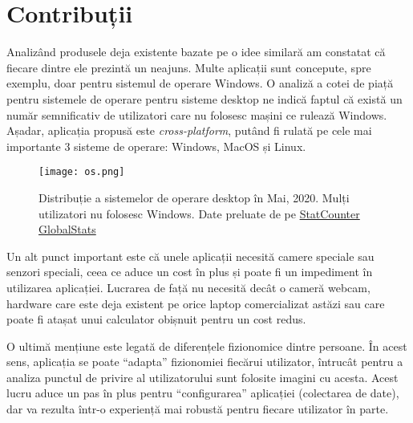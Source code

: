 \chapter*{Contribuții} 

Analizând produsele deja existente bazate pe o idee similară am constatat că fiecare dintre ele prezintă un neajuns.
Multe aplicații sunt concepute, spre exemplu, doar pentru sistemul de operare Windows.
O analiză a cotei de piață pentru sistemele de operare pentru sisteme desktop ne indică faptul că există un număr semnificativ de utilizatori care nu folosesc mașini ce rulează Windows.
Așadar, aplicația propusă este \emph{cross-platform}, putând fi rulată pe cele mai importante 3 sisteme de operare: Windows, MacOS și Linux.

\begin{figure}[h]
    \centering
    \texttt{[image: os.png]}
    \caption{Distribuție a sistemelor de operare desktop în Mai, 2020. Mulți utilizatori nu folosesc Windows. Date preluate de pe \href{https://gs.statcounter.com/os-market-share/desktop/worldwide}{StatCounter GlobalStats}}
\end{figure}

Un alt punct important este că unele aplicații necesită camere speciale sau senzori speciali, ceea ce aduce un cost în plus și poate fi un impediment în utilizarea aplicației.
Lucrarea de față nu necesită decât o cameră webcam, hardware care este deja existent pe orice laptop comercializat astăzi sau care poate fi atașat unui calculator obișnuit pentru un cost redus.

O ultimă mențiune este legată de diferențele fizionomice dintre persoane.
În acest sens, aplicația se poate ``adapta'' fizionomiei fiecărui utilizator, întrucât pentru a analiza punctul de privire al utilizatorului sunt folosite imagini cu acesta.
Acest lucru aduce un pas în plus pentru ``configurarea'' aplicației (colectarea de date), dar va rezulta într-o experiență mai robustă pentru fiecare utilizator în parte.